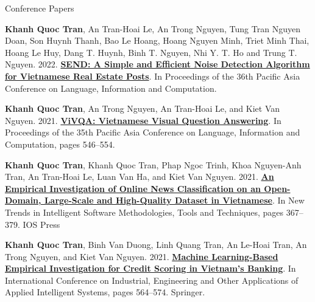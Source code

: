 \begin{cventries}
  \cventryp
    {Conference Papers} %
    {
      \begin{cvitems} %
        \item {\textbf{Khanh Quoc Tran}, An Tran-Hoai Le, An Trong Nguyen, Tung Tran Nguyen Doan, Son Huynh Thanh, Bao Le Hoang, Hoang Nguyen Minh, Triet Minh Thai, Hoang Le Huy, Dang T. Huynh, Binh T. Nguyen, Nhi Y. T. Ho and Trung T. Nguyen. 2022. \href{https://aclanthology.org/2021.paclic-1.72}{\textbf{SEND: A Simple and Efficient Noise Detection Algorithm for Vietnamese Real Estate Posts}}. In Proceedings of the 36th Pacific Asia Conference on Language, Information and Computation. \qtwotag{\textcolor{white}{\textsf\bfseries Rank B}} }
        \item {\textbf{Khanh Quoc Tran}, An Trong Nguyen, An Tran-Hoai Le, and Kiet Van Nguyen. 2021. \href{https://aclanthology.org/2021.paclic-1.72}{\textbf{ViVQA: Vietnamese Visual Question Answering}}. In Proceedings of the 35th Pacific Asia Conference on Language, Information and Computation, pages 546–554. \qtwotag{\textcolor{white}{\textsf\bfseries Rank B}} }
      \end{cvitems}
    }

    \cventryp
    {} %
    {
      \begin{cvitems} %
        \item {\textbf{Khanh Quoc Tran}, Khanh Quoc Tran, Phap Ngoc Trinh, Khoa Nguyen-Anh Tran, An Tran-Hoai Le, Luan Van Ha, and Kiet Van Nguyen. 2021. \href{https://doi.org/10.3233/faia210036}{\textbf{An Empirical Investigation of Online News Classification on an Open-Domain, Large-Scale and High-Quality Dataset in Vietnamese}}. In New Trends in Intelligent Software Methodologies, Tools and Techniques, pages 367–379. IOS Press \qthreetag{\textcolor{white}{\textsf\bfseries Rank C}} }
        \item {\textbf{Khanh Quoc Tran}, Binh Van Duong, Linh Quang Tran, An Le-Hoai Tran, An Trong Nguyen, and Kiet Van Nguyen. 2021. \href{https://doi.org/10.1007/978-3-030-79463-7_48}{\textbf{Machine Learning-Based Empirical Investigation for Credit Scoring in Vietnam’s Banking}}. In International Conference on Industrial, Engineering and Other Applications of Applied Intelligent Systems, pages 564–574. Springer. \qthreetag{\textcolor{white}{\textsf\bfseries Rank C}} }
      \end{cvitems}
    }
\end{cventries}
